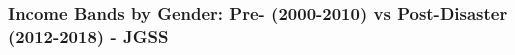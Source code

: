 \documentclass[serif, aspectratio=169]{beamer}
\begin{document}
\begin{frame}[label=income_band_main]
\frametitle{Income Bands by Gender: Pre- (2000-2010) vs Post-Disaster (2012-2018) - JGSS}






\end{frame}
\end{document}
